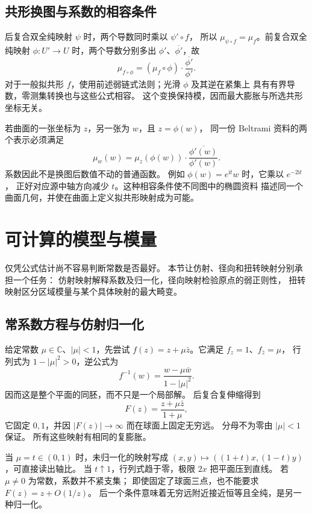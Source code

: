 \subsection{共形换图与系数的相容条件}
\label{b3:subsec:B0203}

后复合双全纯映射 \(\psi\) 时，两个导数同时乘以 \(\psi'\circ f\)，
所以 \(\mu_{\psi\circ f}=\mu_f\)。前复合双全纯映射
\(\phi:U'\rightarrow U\) 时，两个导数分别多出 \(\phi'\)、\(\overline{\phi'}\)，故
\[
 \mu_{f\circ\phi}
 =(\mu_f\circ\phi)\cdot\frac{\overline{\phi'}}{\phi'}.
\]
对于一般拟共形 \(f\)，使用前述弱链式法则；光滑 \(\phi\) 及其逆在紧集上
具有有界导数，零测集转换也与这些公式相容。
这个变换保持模，因而最大膨胀与所选共形坐标无关。

\ProseParagraphBreak

若曲面的一张坐标为 \(z\)，另一张为 \(w\)，且 \(z=\phi(w)\)，
同一份 Beltrami 资料的两个表示必须满足
\[
 \mu_w(w)=\mu_z(\phi(w))\cdot
             \frac{\overline{\phi'(w)}}{\phi'(w)}.
\]
系数因此不是换图后数值不动的普通函数。
例如 \(\phi(w)=e^{\mathrm i t}w\) 时，它乘以 \(e^{-2\mathrm i t}\)，
正好对应源中轴方向减少 \(t\)。这种相容条件使不同图中的椭圆资料
描述同一个曲面几何，并使在曲面上定义拟共形映射成为可能。

\section{可计算的模型与模量}
\label{b3:sec:B03}

仅凭公式估计尚不容易判断常数是否最好。
本节让仿射、径向和扭转映射分别承担一个任务：
仿射映射解释系数及归一化，径向映射检验原点的弱正则性，
扭转映射区分区域模量与某个具体映射的最大畸变。

\subsection{常系数方程与仿射归一化}
\label{b3:subsec:B0301}

给定常数 \(\mu\in\mathbb C\)、\(|\mu|<1\)，先尝试
\(f(z)=z+\mu\bar z\)。它满足 \(f_z=1\)、\(f_{\bar z}=\mu\)，
行列式为 \(1-|\mu|^2>0\)，逆公式为
\[
 f^{-1}(w)=\frac{w-\mu\bar w}{1-|\mu|^2}.
\]
因而这是整个平面的同胚，而不只是一个局部解。
后复合复伸缩得到
\[
 F(z)=\frac{z+\mu\bar z}{1+\mu},
\]
它固定 \(0,1\)，并因 \(|F(z)|\rightarrow\infty\) 而在球面上固定无穷远。
分母不为零由 \(|\mu|<1\) 保证。
所有这些映射有相同的复膨胀。

\ProseParagraphBreak

当 \(\mu=t\in(0,1)\) 时，未归一化的映射写成
\((x,y)\mapsto((1+t)x,(1-t)y)\)，可直接读出轴比。
当 \(t\uparrow1\)，行列式趋于零，极限 \(2x\) 把平面压到直线。
若 \(\mu\ne0\) 为常数，系数并不紧支集；
即使固定了球面三点，也不能要求 \(F(z)=z+O(1/z)\)。
后一个条件意味着无穷远附近接近恒等且全纯，是另一种归一化。


